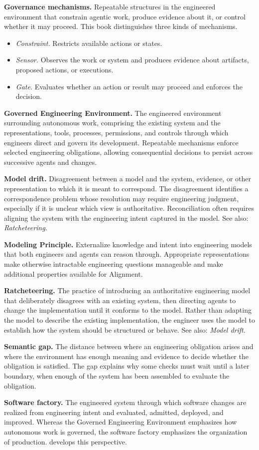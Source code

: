 \textbf{Governance mechanisms.} Repeatable structures in the engineered environment that constrain agentic work, produce evidence about it, or control whether it may proceed. This book distinguishes three kinds of mechanisms.

\begin{itemize}
\item
  \textit{Constraint.} Restricts available actions or states.
\item
  \textit{Sensor.} Observes the work or system and produces evidence about artifacts, proposed actions, or executions.
\item
  \textit{Gate.} Evaluates whether an action or result may proceed and enforces the decision.
\end{itemize}

\textbf{Governed Engineering Environment.} The engineered environment surrounding autonomous work, comprising the existing system and the representations, tools, processes, permissions, and controls through which engineers direct and govern its development. Repeatable mechanisms enforce selected engineering obligations, allowing consequential decisions to persist across successive agents and changes.

\textbf{Model drift.} Disagreement between a model and the system, evidence, or other representation to which it is meant to correspond. The disagreement identifies a correspondence problem whose resolution may require engineering judgment, especially if it is unclear which view is authoritative. Reconciliation often requires aligning the system with the engineering intent captured in the model. See also: \textit{Ratcheteering}.

\textbf{Modeling Principle.} Externalize knowledge and intent into engineering models that both engineers and agents can reason through. Appropriate representations make otherwise intractable engineering questions manageable and make additional properties available for Alignment.


\textbf{Ratcheteering.} The practice of introducing an authoritative engineering model that deliberately disagrees with an existing system, then directing agents to change the implementation until it conforms to the model. Rather than adapting the model to describe the existing implementation, the engineer uses the model to establish how the system should be structured or behave. See also: \textit{Model drift}.

\textbf{Semantic gap.} The distance between where an engineering obligation arises and where the environment has enough meaning and evidence to decide whether the obligation is satisfied. The gap explains why some checks must wait until a later boundary, when enough of the system has been assembled to evaluate the obligation.

\textbf{Software factory.} The engineered system through which software changes are realized from engineering intent and evaluated, admitted, deployed, and improved. Whereas the Governed Engineering Environment emphasizes how autonomous work is governed, the software factory emphasizes the organization of production.  develops this perspective.
